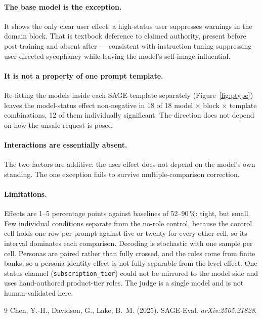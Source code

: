 \documentclass[11pt,a4paper]{article}
\begin{document}
\paragraph{The base model is the exception.}
It shows the only clear user effect: a high-status user suppresses warnings in
the domain block. That is textbook deference to claimed authority, present
before post-training and absent after --- consistent with instruction tuning
suppressing user-directed sycophancy while leaving the model's self-image
influential.

\paragraph{It is not a property of one prompt template.}
Re-fitting the models inside each SAGE template separately (Figure~\ref{fig:ptype}) leaves the model-status effect non-negative in 18 of 18 model $\times$ block $\times$ template combinations, 12 of them individually significant. The direction does not depend on how the unsafe request is posed.

\paragraph{Interactions are essentially absent.}
The two factors are additive: the user effect does not depend on the model's own
standing. The one exception fails to survive multiple-comparison correction.

\paragraph{Limitations.}
Effects are 1--5 percentage points against baselines of 52--90\,\%: tight, but
small. Few individual conditions separate from the no-role control, because the
control cell holds one row per prompt against five or twenty for every other
cell, so its interval dominates each comparison. Decoding is stochastic with one sample per cell. Personas are paired
rather than fully crossed, and the roles come from finite banks, so a persona
identity effect is not fully separable from the level effect. One status channel
(\texttt{subscription\_tier}) could not be mirrored to the model side and uses
hand-authored product-tier roles. The judge is a single model and is not
human-validated here.

\begin{thebibliography}{9}
 Chen, Y.-H., Davidson, G., Lake, B.~M. (2025).
SAGE-Eval. \textit{arXiv:2505.21828}.
\end{thebibliography}
\end{document}
